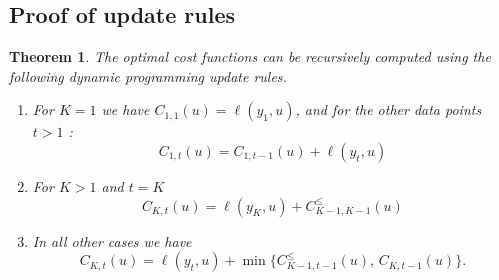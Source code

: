 \documentclass{article}
\newcommand{\FCC}{C}
\newtheorem{theorem}{Theorem}
\begin{document}
\subsection{Proof of update rules}

\begin{theorem}
  The optimal cost functions can be recursively computed using the
  following dynamic programming update rules.
\begin{enumerate}
\item For $K=1$ we have
$\FCC_{1,1}(u)=\ell(y_1,u)$, and for the other data
  points $t>1$ :
\begin{equation}
\FCC_{1,t}(u)=\FCC_{1,t-1}(u)+\ell(y_t,u)
\end{equation}

\item For $K>1$ and $t=K$
\begin{equation}
  \FCC_{K,t}(u)=\ell(y_K, u)+\FCC_{K-1,K-1}^\leq(u)
\end{equation}
\item In all other cases we have
  \begin{equation}
  \FCC_{K,t}(u)=\ell(y_t,u)+
  \min\{
  \FCC_{K-1,t-1}^\leq(u),\,
  \FCC_{K,t-1}(u)
  \}.
  \end{equation}
\end{enumerate}
\end{theorem}
\end{document}
